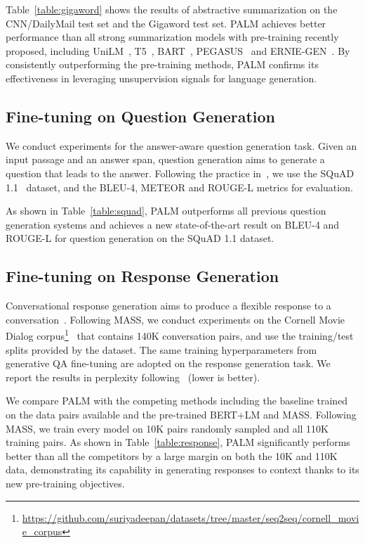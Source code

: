 \documentclass[11pt,a4paper]{article}
\newcommand{\method}{PALM\xspace}
\begin{document}
Table~\ref{table:gigaword} shows the results of abstractive summarization on the CNN/DailyMail test set and the Gigaword test set. PALM achieves better performance than all strong summarization models with pre-training recently proposed, including UniLM~\cite{unilm2019}, T5~\cite{raffel2019exploring}, BART~\cite{bart2019}, PEGASUS~\cite{pegasus} and ERNIE-GEN~\cite{ernie-gen}. By consistently outperforming the pre-training methods, \method confirms its effectiveness in leveraging unsupervision signals for language generation.

\subsection{Fine-tuning on Question Generation}
We conduct experiments for the answer-aware question generation task. Given an input passage and an answer span, question generation aims to generate a question that leads to the answer. Following the practice in~\cite{zhao-etal-2018-paragraph,unilm2019}, we use the SQuAD 1.1~\cite{squad} dataset, and the BLEU-4, METEOR and ROUGE-L metrics for evaluation.

As shown in Table~\ref{table:squad}, \method outperforms all previous question generation systems and achieves a new state-of-the-art result on BLEU-4 and ROUGE-L for question generation on the SQuAD 1.1 dataset.

\subsection{Fine-tuning on Response Generation}
\vspace{-5pt}
Conversational response generation aims to produce a flexible response to a conversation~\cite{Vinyals:2015}. Following MASS, we conduct experiments on the Cornell Movie Dialog corpus\footnote{\url{https://github.com/suriyadeepan/datasets/tree/master/seq2seq/cornell_movie_corpus}}~\cite{Danescu:2011} that contains 140K conversation pairs, and use the training/test splits provided by the dataset. The same training hyperparameters from generative QA fine-tuning are adopted on the response generation task. We report the results in perplexity following~\cite{Vinyals:2015} (lower is better).

We compare \method with the competing methods including the baseline trained on the data pairs available and the pre-trained BERT+LM and MASS. Following MASS, we train every model on 10K pairs randomly sampled and all 110K training pairs. As shown in Table~\ref{table:response}, \method significantly performs better than all the competitors by a large margin on both the 10K and 110K data, demonstrating its capability in generating responses to context thanks to its new pre-training objectives.
\end{document}
